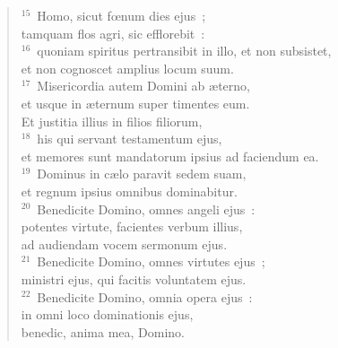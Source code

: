 \begin{flushleft}
\begin{verse}
${}^{15}$~Homo, sicut fœnum dies ejus~;\\ tamquam flos agri, sic efflorebit~:\\
${}^{16}$~quoniam spiritus pertransibit in illo, et non subsistet,\\ et non cognoscet amplius locum suum.\\
${}^{17}$~Misericordia autem Domini ab \ae terno,\\ et usque in \ae ternum super timentes eum.\\ Et justitia illius in filios filiorum,\\
${}^{18}$~his qui servant testamentum ejus,\\ et memores sunt mandatorum ipsius ad faciendum ea.\\
${}^{19}$~Dominus in c\ae lo paravit sedem suam,\\ et regnum ipsius omnibus dominabitur.\\
${}^{20}$~Benedicite Domino, omnes angeli ejus~:\\ potentes virtute, facientes verbum illius,\\ ad audiendam vocem sermonum ejus.\\
${}^{21}$~Benedicite Domino, omnes virtutes ejus~;\\ ministri ejus, qui facitis voluntatem ejus.\\
${}^{22}$~Benedicite Domino, omnia opera ejus~:\\ in omni loco dominationis ejus,\\ benedic, anima mea, Domino.\end{verse}\end{flushleft}


